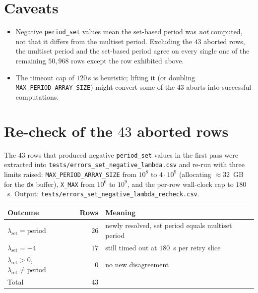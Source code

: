 \documentclass[11pt]{article}
\begin{document}
\section*{Caveats}

\begin{itemize}
\item Negative \texttt{period\_set} values mean the set-based period was
      \emph{not} computed, not that it differs from the multiset period.
      Excluding the $43$ aborted rows, the multiset period and the
      set-based period agree on every single one of the remaining
      $50{,}968$ rows except the row exhibited above.
\item The timeout cap of $120$\,s is heuristic; lifting it (or doubling
      \texttt{MAX\_PERIOD\_ARRAY\_SIZE}) might convert some of the $43$
      aborts into successful computations.
\end{itemize}

\section*{Re-check of the $43$ aborted rows}

The $43$ rows that produced negative \texttt{period\_set} values in the
first pass were extracted into
\texttt{tests/errors\_set\_negative\_lambda.csv} and re-run with three
limits raised:
\texttt{MAX\_PERIOD\_ARRAY\_SIZE} from $10^{8}$ to $4\!\cdot\!10^{9}$
(allocating $\approx 32$~GB for the \texttt{dx} buffer),
\texttt{X\_MAX} from $10^{6}$ to $10^{9}$, and the per-row wall-clock cap
to $180$~s. Output: \texttt{tests/errors\_set\_negative\_lambda\_recheck.csv}.

\begin{center}
\begin{tabular}{lrl}
\toprule
Outcome & Rows & Meaning \\
\midrule
$\lambda_{\text{set}} = \mathrm{period}$ & $26$ & newly resolved, set period equals multiset period \\
$\lambda_{\text{set}} = -4$              & $17$ & still timed out at $180$~s per retry slice \\
$\lambda_{\text{set}} > 0$, $\lambda_{\text{set}} \neq \mathrm{period}$ & $0$ & no new disagreement \\
\midrule
Total                                    & $43$ & \\
\bottomrule
\end{tabular}
\end{center}
\end{document}
